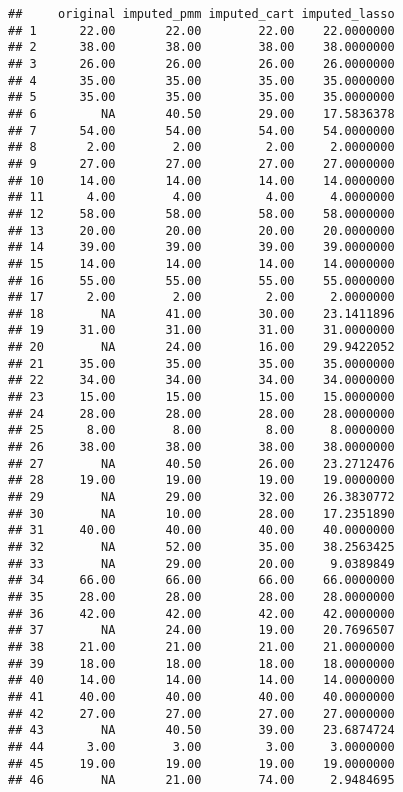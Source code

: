\documentclass[
]{article}
\begin{document}
\begin{verbatim}
##     original imputed_pmm imputed_cart imputed_lasso
## 1      22.00       22.00        22.00    22.0000000
## 2      38.00       38.00        38.00    38.0000000
## 3      26.00       26.00        26.00    26.0000000
## 4      35.00       35.00        35.00    35.0000000
## 5      35.00       35.00        35.00    35.0000000
## 6         NA       40.50        29.00    17.5836378
## 7      54.00       54.00        54.00    54.0000000
## 8       2.00        2.00         2.00     2.0000000
## 9      27.00       27.00        27.00    27.0000000
## 10     14.00       14.00        14.00    14.0000000
## 11      4.00        4.00         4.00     4.0000000
## 12     58.00       58.00        58.00    58.0000000
## 13     20.00       20.00        20.00    20.0000000
## 14     39.00       39.00        39.00    39.0000000
## 15     14.00       14.00        14.00    14.0000000
## 16     55.00       55.00        55.00    55.0000000
## 17      2.00        2.00         2.00     2.0000000
## 18        NA       41.00        30.00    23.1411896
## 19     31.00       31.00        31.00    31.0000000
## 20        NA       24.00        16.00    29.9422052
## 21     35.00       35.00        35.00    35.0000000
## 22     34.00       34.00        34.00    34.0000000
## 23     15.00       15.00        15.00    15.0000000
## 24     28.00       28.00        28.00    28.0000000
## 25      8.00        8.00         8.00     8.0000000
## 26     38.00       38.00        38.00    38.0000000
## 27        NA       40.50        26.00    23.2712476
## 28     19.00       19.00        19.00    19.0000000
## 29        NA       29.00        32.00    26.3830772
## 30        NA       10.00        28.00    17.2351890
## 31     40.00       40.00        40.00    40.0000000
## 32        NA       52.00        35.00    38.2563425
## 33        NA       29.00        20.00     9.0389849
## 34     66.00       66.00        66.00    66.0000000
## 35     28.00       28.00        28.00    28.0000000
## 36     42.00       42.00        42.00    42.0000000
## 37        NA       24.00        19.00    20.7696507
## 38     21.00       21.00        21.00    21.0000000
## 39     18.00       18.00        18.00    18.0000000
## 40     14.00       14.00        14.00    14.0000000
## 41     40.00       40.00        40.00    40.0000000
## 42     27.00       27.00        27.00    27.0000000
## 43        NA       40.50        39.00    23.6874724
## 44      3.00        3.00         3.00     3.0000000
## 45     19.00       19.00        19.00    19.0000000
## 46        NA       21.00        74.00     2.9484695

\end{verbatim}
\end{document}
